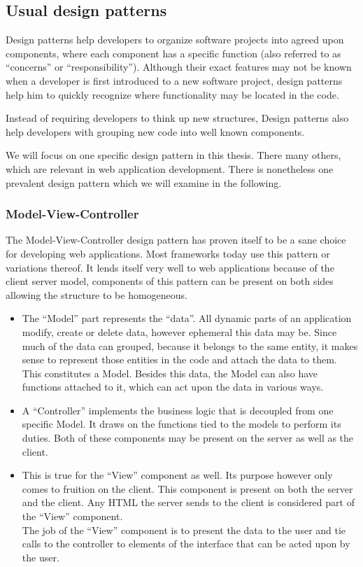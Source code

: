 \documentclass[thesis.tex]{subfiles}
\begin{document}
\subsection{Usual design patterns}
Design patterns help developers to organize software projects into agreed upon
components, where each component has a specific function
(also referred to as ``concerns'' or ``responsibility'').
Although their exact features may not be known when a developer is first
introduced to a new software project, design patterns help him to quickly
recognize where functionality may be located in the code.

Instead of requiring developers to think up new structures, Design patterns
also help developers with grouping new code into well known components.

We will focus on one specific design pattern in this thesis. There many others,
which are relevant in web application development. There is nonetheless one
prevalent design pattern which we will examine in the following.

\subsubsection{Model-View-Controller}
The Model-View-Controller design pattern has proven itself to be a sane
choice for developing web applications. Most frameworks today use this
pattern or variations thereof.
It lends itself very well to web applications because of the client server
model, components of this pattern can be present on both sides allowing the
structure to be homogeneous.

\begin{itemize}
	\item The ``Model'' part represents the ``data''. All dynamic parts of an
	application modify, create or delete data, however ephemeral this data may
	be. Since much of the data can grouped, because it belongs to the same
	entity, it makes sense to represent those entities in the code and
	attach the data to them. This constitutes a Model. Besides this data,
	the Model can also have functions attached to it, which can act upon the data
	in various ways.
	\item A ``Controller'' implements the business logic that is decoupled from one
	specific Model. It draws on the functions tied to the models to perform its
	duties. Both of these components may be present on the server as well
	as the client.
	\item This is true for the ``View'' component as well. Its purpose however only
	comes to fruition on the client. This component is present on both the server
	and the client. Any HTML the server sends to the client is considered part of
	the ``View'' component.\\
	The job of the ``View'' component is to present the data to the user and
	tie calls to the controller to elements of the interface that can be acted
	upon by the user.
\end{itemize}
\end{document}
